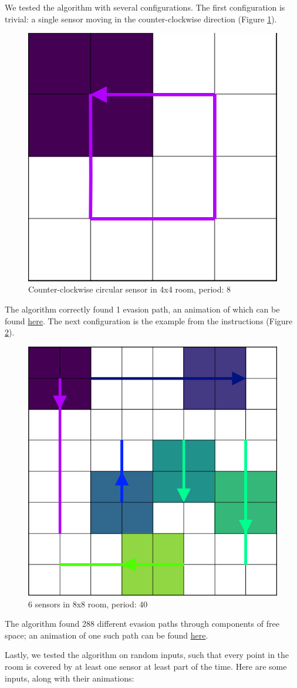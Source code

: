 \documentclass{article}
\begin{document}
We tested the algorithm with several configurations.
The first configuration is trivial: a single sensor moving in the counter-clockwise direction (Figure \ref{fig:ccw}).
\begin{figure}[H]
  \centering
  \includegraphics[width=0.3\linewidth]{ccw.png}
  \caption{Counter-clockwise circular sensor in 4x4 room, period: 8}
  \label{fig:ccw}
\end{figure}

The algorithm correctly found 1 evasion path, an animation of which can be found \href{https://github.com/MOj0/TDA_Evasion/blob/main/report/ccw.gif}{here}.
The next configuration is the example from the instructions (Figure \ref{fig:example}).
\begin{figure}[H]
  \centering
  \includegraphics[width=0.6\linewidth]{example.png}
  \caption{6 sensors in 8x8 room, period: 40}
  \label{fig:example}
\end{figure}

The algorithm found 288 different evasion paths through components of free space; an animation of one such path can be found \href{https://github.com/MOj0/TDA_Evasion/blob/main/report/example.gif}{here}.

\bigskip

Lastly, we tested the algorithm on random inputs, such that every point in the room is covered by at least one sensor at least part of the time.
Here are some inputs, along with their animations:
\end{document}
